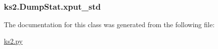 \hypertarget{classks2_1_1_dump_stat_aa454df892cfe10f8a6eafb9913b52c10}{
\subsubsection[{xput\-\_\-std}]{\setlength{\rightskip}{0pt plus 5cm}ks2.\-Dump\-Stat.\-xput\-\_\-std}}\label{classks2_1_1_dump_stat_aa454df892cfe10f8a6eafb9913b52c10}


The documentation for this class was generated from the following file\-:\begin{DoxyCompactItemize}
\item 
\hyperlink{ks2_8py}{ks2.\-py}\end{DoxyCompactItemize}
